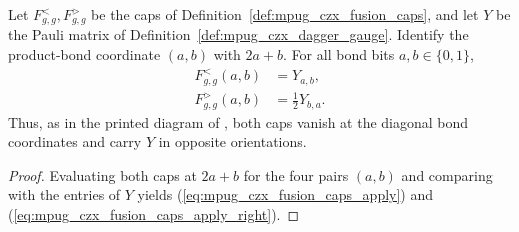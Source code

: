 \begin{lemma}
    \label{thm:mpug_czx_fusion_caps_apply}
    \leanok
    Let $F^<_{g,g},F^>_{g,g}$ be the caps of
    Definition~\ref{def:mpug_czx_fusion_caps}, and let $Y$ be the Pauli
    matrix of Definition~\ref{def:mpug_czx_dagger_gauge}. Identify the
    product-bond coordinate $(a,b)$ with $2a+b$. For all bond bits
    $a,b\in\{0,1\}$,
    \begin{align}
        F^<_{g,g}(a,b) & =Y_{a,b},
        \label{eq:mpug_czx_fusion_caps_apply} \\
        F^>_{g,g}(a,b) & =\tfrac12Y_{b,a}.
        \label{eq:mpug_czx_fusion_caps_apply_right}
    \end{align}
    Thus, as in the printed diagram of
    \cite[lines~4671--4689]{FrancoRubio2025MPUGauging}, both caps vanish at
    the diagonal bond coordinates and carry $Y$ in opposite orientations.
\end{lemma}
\begin{proof}\leanok
    Evaluating both caps at $2a+b$ for the four pairs $(a,b)$ and comparing
    with the entries of $Y$ yields
    (\ref{eq:mpug_czx_fusion_caps_apply}) and
    (\ref{eq:mpug_czx_fusion_caps_apply_right}).
\end{proof}

